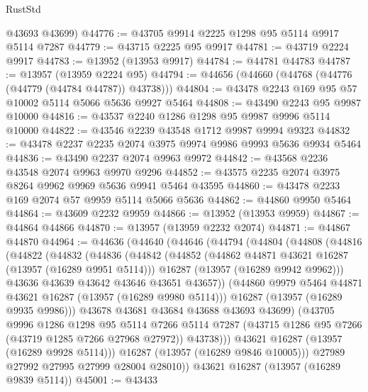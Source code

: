 \begin{lexlean}{RustStd}
\begin{coremodule}
      @43693
      @43699)
@44776 := @43705 @9914 @2225 @1298 @95 @5114 @9917 @5114 @7287
@44779 := @43715 @2225 @95 @9917
@44781 := @43719 @2224 @9917
@44783 := @13952 (@13953 @9917)
@44784 := @44781 @44783
@44787 := @13957 (@13959 @2224 @95)
@44794 := @44656 (@44660 (@44768 (@44776 (@44779 (@44784 @44787)) @43738)))
@44804 := @43478 @2243 @169 @95 @57 @10002 @5114 @5066 @5636 @9927 @5464
@44808 := @43490 @2243 @95 @9987 @10000
@44816 := @43537 @2240 @1286 @1298 @95 @9987 @9996 @5114 @10000
@44822 := @43546 @2239 @43548 @1712 @9987 @9994 @9323
@44832 := @43478 @2237 @2235 @2074 @3975 @9974 @9986 @9993 @5636 @9934 @5464
@44836 := @43490 @2237 @2074 @9963 @9972
@44842 := @43568 @2236 @43548 @2074 @9963 @9970 @9296
@44852 := @43575 @2235 @2074 @3975 @8264 @9962 @9969 @5636 @9941 @5464 @43595
@44860 := @43478 @2233 @169 @2074 @57 @9959 @5114 @5066 @5636
@44862 := @44860 @9950 @5464
@44864 := @43609 @2232 @9959
@44866 := @13952 (@13953 @9959)
@44867 := @44864 @44866
@44870 := @13957 (@13959 @2232 @2074)
@44871 := @44867 @44870
@44964 := @44636
    (@44640
      (@44646
        (@44794
          (@44804
            (@44808
              (@44816
                (@44822
                  (@44832
                    (@44836
                      (@44842
                        (@44852
                          (@44862 @44871 @43621 @16287 (@13957 (@16289 @9951 @5114)))
                          @16287
                          (@13957 (@16289 @9942 @9962)))
                        @43636
                        @43639
                        @43642
                        @43646
                        @43651
                        @43657))
                    (@44860 @9979 @5464 @44871 @43621 @16287 (@13957 (@16289 @9980 @5114)))
                    @16287
                    (@13957 (@16289 @9935 @9986)))
                  @43678
                  @43681
                  @43684
                  @43688
                  @43693
                  @43699)
                (@43705
                  @9996
                  @1286
                  @1298
                  @95
                  @5114
                  @7266
                  @5114
                  @7287
                  (@43715 @1286 @95 @7266 (@43719 @1285 @7266 @27968 @27972))
                  @43738)))
            @43621
            @16287
            (@13957 (@16289 @9928 @5114)))
          @16287
          (@13957 (@16289 @9846 @10005)))
        @27989
        @27992
        @27995
        @27999
        @28004
        @28010))
    @43621
    @16287
    (@13957 (@16289 @9839 @5114))
@45001 := @43433

\end{coremodule}
\end{lexlean}
